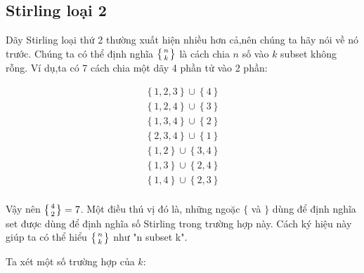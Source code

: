 
\subsection{Stirling loại 2}


Dãy Stirling loại thứ 2 thường xuất hiện nhiều hơn cả,nên chúng ta hãy nói về nó trước. 
Chúng ta có thể định nghĩa 
${\displaystyle \textstyle \left \{ {n \atop k} \right \} }$
là cách chia $n$ số vào $k$ subset không rỗng. 
Ví dụ,ta có 7 cách chia một dãy 4 phần tử vào 2 phần: 


\begin{equation} 
    \begin{aligned}
        \left\{ 1,2,3 \right\} \cup \left\{ 4\right\} \\
        \left\{1,2,4\right\} \cup \left\{ 3\right\} \\
        \left\{ 1,3,4 \right\} \cup \left\{ 2\right\} \\
        \left\{2,3,4 \right\} \cup \left\{1 \right\} \\
        \left\{1,2\right\} \cup \left\{ 3,4\right\} \\
        \left\{ 1,3\right\} \cup \left\{ 2, 4\right\} \\
        \left\{1,4\right\} \cup \left\{2,3\right\} \\ 
    \end{aligned} \label{eq:6.1}
\end{equation}

\indent
Vậy nên $\displaystyle \textstyle \left \{ {4 \atop 2} \right \} = 7$.
Một điều thú vị đó là, những ngoặc $\{$ và $\}$ dùng để định nghĩa set 
được dùng để định nghĩa số Stirling trong trường hợp này.
Cách ký hiệu này giúp ta có thể hiểu 
$\left \{ {n \atop k} \right \}$ 
như "n subset k".

\indent
Ta xét một số trường hợp của $k$:

